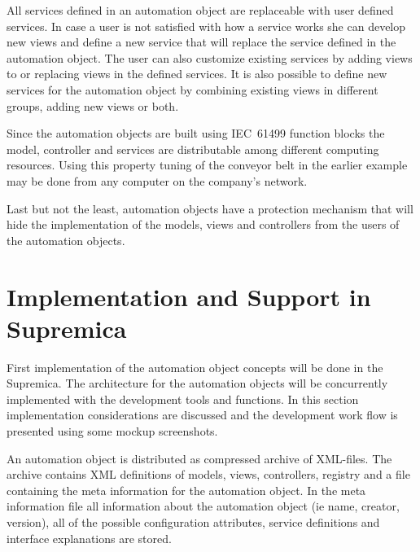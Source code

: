 All services defined in an automation object are replaceable
with user defined services. In case a user is not satisfied
with how a service works she can develop new views and
define a new service that will replace the service defined
in the automation object. The user can also customize
existing services by adding views to or replacing views in
the defined services. It is also possible to define new
services for the automation object by combining existing
views in different groups, adding new views or both.

Since the automation objects are built using IEC~61499
function blocks the model, controller and services are
distributable among different computing resources. Using
this property tuning of the conveyor belt in the earlier
example may be done from any computer on the company's
network.

Last but not the least, automation objects have a
protection mechanism that will hide the implementation of
the models, views and controllers from the users of the
automation objects.


\section{Implementation and Support in Supremica}
First implementation of the automation object concepts will
be done in the Supremica. The architecture for the
automation objects will be concurrently implemented with the
development tools and functions. In this section
implementation considerations are discussed and the
development work flow is presented using some mockup
screenshots.

An automation object is distributed as compressed archive of
XML-files. The archive contains XML definitions of models,
views, controllers, registry and a file containing the meta
information for the automation object. In the meta
information file all information about the automation object
(ie name, creator, version), all of the possible
configuration attributes, service definitions and interface
explanations are stored.


